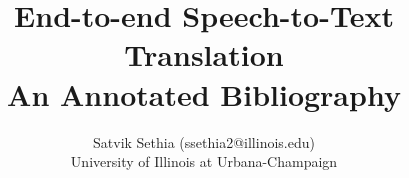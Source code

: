 \documentclass [11pt]{article}
\title{End-to-end Speech-to-Text Translation\\\medskip An Annotated Bibliography}
\author{Satvik Sethia (ssethia2@illinois.edu)\\ University of Illinois at Urbana-Champaign}
\begin{document}
\maketitle
\nocite{*}


\end{document}
